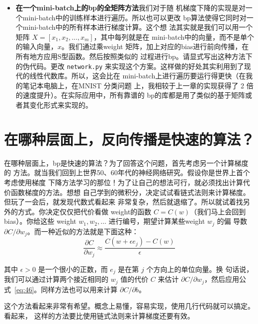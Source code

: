 \begin{itemize}
\item \textbf{在一个\gls*{mini-batch}上的\gls*{bp}的全矩阵方法}\quad 我们对于随
  机梯度下降的实现是对一个\gls*{mini-batch}中的训练样本进行遍历。所以也可以更改%
  \gls*{bp}算法使得它同时对一个\gls*{mini-batch}中的所有样本进行梯度计算。这个想
  法其实就是我们可以用一个矩阵 $X=[x_1, x_2, ..., x_m]$，其中每列就是在%
  \gls*{mini-batch}中的向量，而不是单个的输入向量，$x$。我们通过乘\gls*{weight}
  矩阵，加上对应的\gls*{bias}进行前向传播，在所有地方应用S型函数。然后按照类似的
  过程进行\gls*{bp}。请显式写出这种方法下的伪代码。更改 \lstinline!network.py!
  来实现这个方案。这样做的好处其实利用到了现代的线性代数库。所以，这会比在%
  \gls*{mini-batch}上进行遍历要运行得更快（在我的笔记本电脑上，在MNIST 分类问题
    上，我相较于上一章的实现获得了 2 倍的速度提升）。在实际应用中，所有靠谱的%
  \gls*{bp}的库都是用了类似的基于矩阵或者其变化形式来实现的。
\end{itemize}

\section{在哪种层面上，反向传播是快速的算法？}

在哪种层面上，\gls*{bp}是快速的算法？为了回答这个问题，首先考虑另一个计算梯度的
方法。就当我们回到上世界50、60年代的神经网络研究。假设你是世界上首个考虑使用梯度
下降方法学习的那位！为了让自己的想法可行，就必须找出计算代价函数梯度的方法。想想
自己学到的微积分，决定试试看链式法则来计算梯度。但玩了一会后，就发现代数式看起来
非常复杂，然后就退缩了。所以就试着找另外的方式。你决定仅仅把代价看做%
\gls*{weight}的函数 $C = C(w)$（我们马上会回到\gls*{bias}）。你给这些%
\gls*{weight} $w_1, w_2, \ldots$ 进行编号，期望计算某些\gls*{weight} $w_j$ 的偏
导数 $\partial C / \partial w_j$。而一种近似的方法就是下面这种：
\begin{equation}
  \frac{\partial
    C}{\partial w_{j}} \approx \frac{C(w+\epsilon
    e_j)-C(w)}{\epsilon}
  \label{eq:46}\tag{46}
\end{equation}

其中 $\epsilon > 0$ 是一个很小的正数，而 $e_j$ 是在第 $j$ 个方向上的单位向量。换
句话说，我们可以通过计算两个接近相同的 $w_j$ 值的代价 $C$ 来估计 $\partial
C/\partial w_j$，然后应用公式~\eqref{eq:46}。同样方法也可以用来计算 $\partial
C/\partial b$。

这个方法看起来非常有希望。概念上易懂，容易实现，使用几行代码就可以搞定。看起来，
这样的方法要比使用链式法则来计算梯度还要有效。

